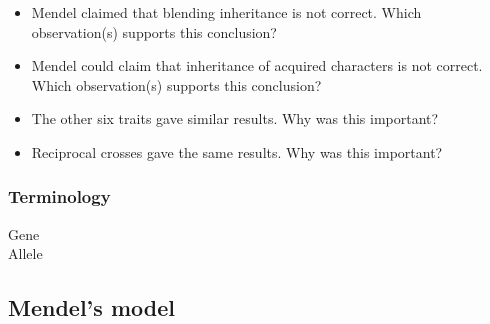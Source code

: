 \begin{frame}
    \begin{itemize}[<+->]
        \item Mendel claimed that blending inheritance is not correct. Which
            observation(s) supports this conclusion?

        \item Mendel could claim that inheritance of acquired characters is not
            correct. Which observation(s) supports this conclusion?

        \item The other six traits gave similar results. Why was this
            important?

        \item Reciprocal crosses gave the same results. Why was this important?
    \end{itemize}
\end{frame}

\begin{frame}
    \frametitle{Terminology}
    \begin{description}
        \item[Gene] 
        \item[Allele] 
    \end{description}
\end{frame}

\subsection{Mendel's model}


